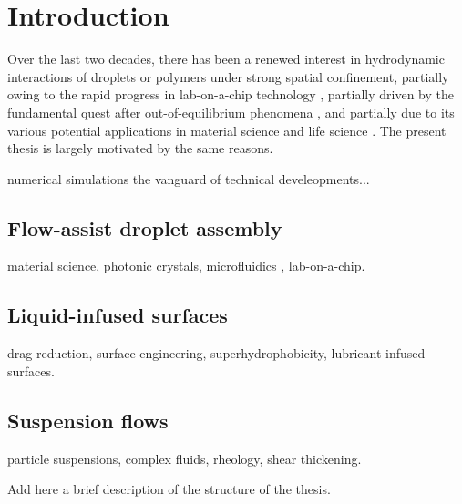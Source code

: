 \graphicspath{{imgs/}}

\chapter{Introduction}



Over the last two decades, there has been a renewed interest in hydrodynamic interactions of droplets or polymers under strong spatial confinement, partially owing to the rapid progress in lab-on-a-chip technology \citep{Squires_Quakes_2005}, partially driven by the fundamental quest after out-of-equilibrium phenomena \citep{Cui_etal_2002, Cui2004, Diamant_2005, tlusty, Davit_2008, q2d_Beatus}, and partially due to its various potential applications in material science and life science \citep{tabeling, organs-on-chips}. The present thesis is largely motivated by the same reasons.

numerical simulations the vanguard of technical develeopments...



\section{Flow-assist droplet assembly}

material science,
photonic crystals,
microfluidics \citep{Squires_Quakes_2005, microfluidics},
lab-on-a-chip.


\section{Liquid-infused surfaces}

drag reduction,
surface engineering,
superhydrophobicity,
lubricant-infused surfaces.


\section{Suspension flows}

particle suspensions,
complex fluids,
rheology,
shear thickening.

\thesisstructure Add here a brief description of the structure of the thesis.



